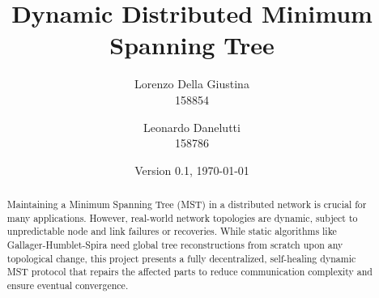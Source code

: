 \documentclass{memoir}
\title{Dynamic Distributed Minimum Spanning Tree}
\author{Lorenzo Della Giustina\\ 158854
\and Leonardo Danelutti\\ 158786}
\date{Version 0.1, \today}
\begin{document}
\maketitle
\begin{abstract}
Maintaining a Minimum Spanning Tree (MST) in a distributed network is crucial for many applications. However, real-world network topologies are dynamic, subject to unpredictable node and link failures or recoveries. While static algorithms like Gallager-Humblet-Spira \cite{GHS1983} need global tree reconstructions from scratch upon any topological change, this project presents a fully decentralized, self-healing dynamic MST protocol that repairs the affected parts to reduce communication complexity and ensure eventual convergence.
\end{abstract}

\nocite{*}


\end{document}
